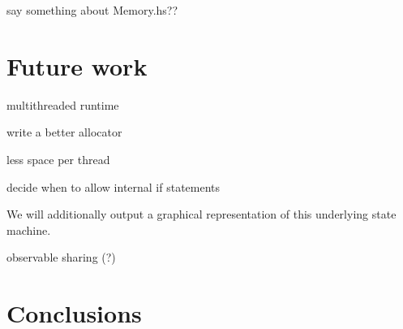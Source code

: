 \documentclass[preprint,11pt]{sigplanconf}
\begin{document}
say something about Memory.hs??


\section{Future work}

multithreaded runtime

write a better allocator

less space per thread

decide when to allow internal if statements

We will additionally output a graphical representation of this underlying state
machine.

observable sharing (?)

\section{Conclusions}

{}

\end{document}
